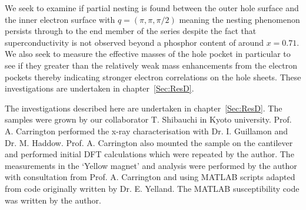 We seek to examine if partial nesting is found between the outer hole surface and the inner electron surface with $q=(\pi, \pi, \pi/2)$ meaning the nesting phenomenon persists through to the end member of the series despite the fact that superconductivity is not observed beyond a phosphor content of around $x=0.71$. We also seek to measure the effective masses of the hole pocket in particular to see if they greater than the relatively weak mass enhancements from the electron pockets thereby indicating stronger electron correlations on the hole sheets. These investigations are undertaken in chapter~\ref{Sec:ResD}.

The investigations described here are undertaken in chapter~\ref{Sec:ResD}. The samples were grown by our collaborator T. Shibauchi in Kyoto university. Prof. A. Carrington performed the x-ray characterisation with Dr. I. Guillamon and Dr. M. Haddow. Prof. A. Carrington also mounted the sample on the cantilever and performed initial \ac{DFT} calculations which were repeated by the author. The measurements in the `Yellow magnet' and analysis were performed by the author with consultation from Prof. A. Carrington and using MATLAB scripts adapted from code originally written by Dr. E. Yelland. The MATLAB susceptibility code was written by the author.





